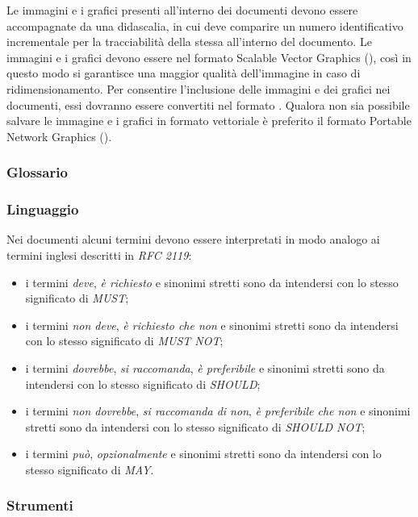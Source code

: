 \documentclass[12pt,a4paper]{article}
\begin{document}
Le immagini e i grafici presenti all'interno dei documenti devono essere accompagnate da una didascalia, in cui deve comparire un numero identificativo incrementale per la tracciabilità della stessa all'interno del documento. Le immagini e i grafici devono essere nel formato Scalable Vector Graphics (), così in questo modo si garantisce una maggior qualità dell'immagine in caso di ridimensionamento. Per consentire l'inclusione delle immagini e dei grafici nei documenti, essi dovranno essere convertiti nel formato  . Qualora non sia possibile salvare le immagine e i grafici in formato vettoriale è preferito il formato Portable Network Graphics ().

\subsubsection{Glossario}
\glossarioPrint

\subsubsection{Linguaggio}
Nei documenti alcuni termini devono essere interpretati in modo analogo ai termini inglesi descritti in \textit{RFC 2119}:
\begin{itemize}
	\item i termini \emph{deve}, \emph{è richiesto} e sinonimi stretti sono da intendersi con lo stesso significato di \emph{MUST};
	\item i termini \emph{non deve}, \emph{è richiesto che non} e sinonimi stretti sono da intendersi con lo stesso significato di \emph{MUST NOT};
	\item i  termini \emph{dovrebbe}, \emph{si raccomanda}, \emph{è preferibile} e sinonimi stretti sono da intendersi con lo stesso significato di \emph{SHOULD};
	\item i termini \emph{non dovrebbe}, \emph{si raccomanda di non}, \emph{è preferibile che non} e sinonimi stretti sono da intendersi con lo stesso significato di \emph{SHOULD NOT};
	\item i termini \emph{può}, \emph{opzionalmente} e sinonimi stretti sono da intendersi con lo stesso significato di \emph{MAY}.
\end{itemize}

\subsubsection{Strumenti}
\end{document}
